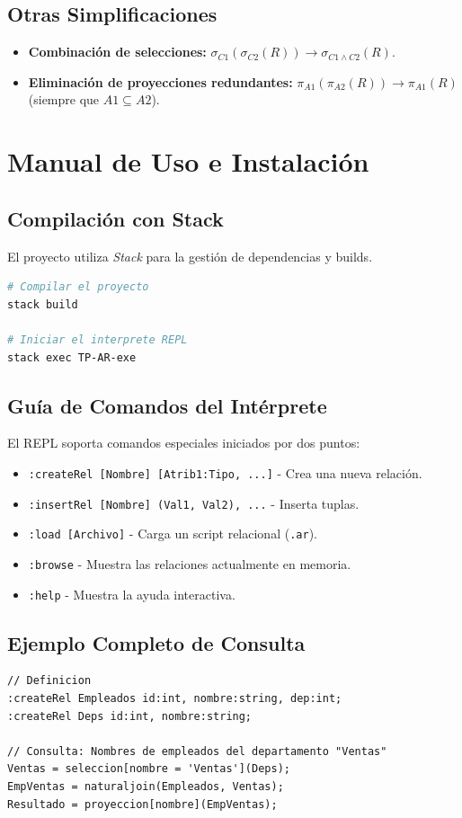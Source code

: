 \documentclass[12pt]{report}
\begin{document}
\section{Otras Simplificaciones}
\begin{itemize}
    \item \textbf{Combinación de selecciones:} $\sigma_{C1}(\sigma_{C2}(R)) \rightarrow \sigma_{C1 \land C2}(R)$.
    \item \textbf{Eliminación de proyecciones redundantes:} $\pi_{A1}(\pi_{A2}(R)) \rightarrow \pi_{A1}(R)$ (siempre que $A1 \subseteq A2$).
\end{itemize}

\chapter{Manual de Uso e Instalación}

\section{Compilación con Stack}
El proyecto utiliza \textit{Stack} para la gestión de dependencias y builds.
\begin{lstlisting}[language=bash]
# Compilar el proyecto
stack build

# Iniciar el interprete REPL
stack exec TP-AR-exe
\end{lstlisting}

\section{Guía de Comandos del Intérprete}
El REPL soporta comandos especiales iniciados por dos puntos:
\begin{itemize}
    \item \texttt{:createRel [Nombre] [Atrib1:Tipo, ...]} - Crea una nueva relación.
    \item \texttt{:insertRel [Nombre] (Val1, Val2), ...} - Inserta tuplas.
    \item \texttt{:load [Archivo]} - Carga un script relacional (\texttt{.ar}).
    \item \texttt{:browse} - Muestra las relaciones actualmente en memoria.
    \item \texttt{:help} - Muestra la ayuda interactiva.
\end{itemize}

\section{Ejemplo Completo de Consulta}
\begin{lstlisting}
// Definicion
:createRel Empleados id:int, nombre:string, dep:int;
:createRel Deps id:int, nombre:string;

// Consulta: Nombres de empleados del departamento "Ventas"
Ventas = seleccion[nombre = 'Ventas'](Deps);
EmpVentas = naturaljoin(Empleados, Ventas);
Resultado = proyeccion[nombre](EmpVentas);
\end{lstlisting}
\end{document}
